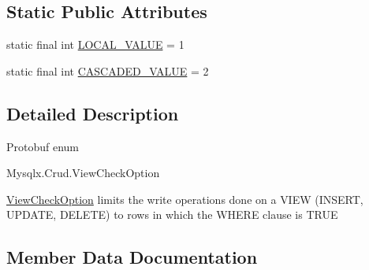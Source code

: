 \subsection*{Static Public Attributes}
\begin{DoxyCompactItemize}
\item 
static final int \mbox{\hyperlink{enumcom_1_1mysql_1_1cj_1_1x_1_1protobuf_1_1_mysqlx_crud_1_1_view_check_option_a2cdae5757280587dd0588a361144d36b}{L\+O\+C\+A\+L\+\_\+\+V\+A\+L\+UE}} = 1
\item 
static final int \mbox{\hyperlink{enumcom_1_1mysql_1_1cj_1_1x_1_1protobuf_1_1_mysqlx_crud_1_1_view_check_option_ae146abda3cf8edf9b12f55253cff5bc5}{C\+A\+S\+C\+A\+D\+E\+D\+\_\+\+V\+A\+L\+UE}} = 2
\end{DoxyCompactItemize}


\subsection{Detailed Description}
Protobuf enum
\begin{DoxyCode}
Mysqlx.Crud.ViewCheckOption 
\end{DoxyCode}



\begin{DoxyPre}
\mbox{\hyperlink{enumcom_1_1mysql_1_1cj_1_1x_1_1protobuf_1_1_mysqlx_crud_1_1_view_check_option}{ViewCheckOption}} limits the write operations done on a {\ttfamily VIEW}
({\ttfamily INSERT}, {\ttfamily UPDATE}, {\ttfamily DELETE}) to rows in which the {\ttfamily WHERE} clause is {\ttfamily TRUE}
\end{DoxyPre}
 

\subsection{Member Data Documentation}
\mbox{\label{enumcom_1_1mysql_1_1cj_1_1x_1_1protobuf_1_1_mysqlx_crud_1_1_view_check_option_a34e569a3da32cc1a6746e3ab862dcc1c}} 
